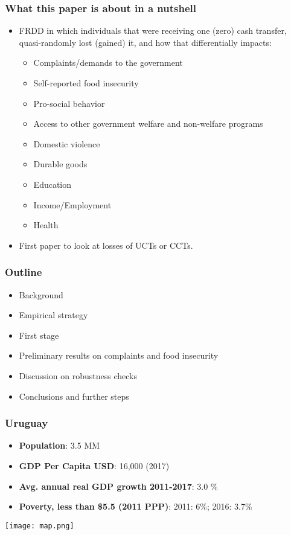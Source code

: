 \documentclass{beamer}
\begin{document}
\begin{frame}
\frametitle{What this paper is about in a nutshell}
\begin{itemize}
\item FRDD in which individuals that were receiving one (zero) cash transfer, quasi-randomly lost (gained) it, and how that differentially impacts:
\begin{itemize}
	\item Complaints/demands to the government
	\item Self-reported food insecurity
	\item {\color{gray}Pro-social behavior}
	\item {\color{gray}Access to other government welfare and non-welfare programs}
	\item {\color{gray}Domestic violence}
	\item {\color{gray}Durable goods}
	\item {\color{gray}Education}
	\item {\color{gray}Income/Employment}
	\item {\color{gray}Health}
\end{itemize}
\item First paper to look at losses of UCTs or CCTs.
\end{itemize}
\end{frame}

\begin{frame}
\frametitle{Outline}
\begin{itemize}
\item Background
\item Empirical strategy
\item First stage
\item Preliminary results on complaints and food insecurity
\item Discussion on robustness checks
\item Conclusions and further steps
\end{itemize}
\end{frame}

\begin{frame}
\frametitle{Uruguay}
\begin{itemize}
\item \textbf{Population}: 3.5 MM
\item \textbf{GDP Per Capita USD}: 16,000 (2017)
\item \textbf{Avg. annual real GDP growth 2011-2017}: 3.0 \%
\item \textbf{Poverty, less than \$5.5 (2011 PPP)}: 2011: 6\%; 2016: 3.7\%	
\end{itemize}
\begin{center}
	\texttt{[image: map.png]}
	\label{map}
\end{center}
\end{frame}
\end{document}
